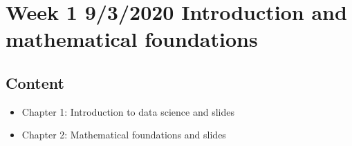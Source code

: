 \documentclass[letterpaper,10pt,english]{sphinxmanual}
\begin{document}
\section{Week 1 \sphinxhyphen{} 9/3/2020 \sphinxhyphen{} Introduction and mathematical foundations}
\label{\detokenize{course-schedule:week-1-9-3-2020-introduction-and-mathematical-foundations}}

\subsection{Content}
\label{\detokenize{course-schedule:content}}\begin{itemize}
\item {} 
Chapter 1: Introduction to data science \sphinxhyphen{} {\hyperref[\detokenize{chapter-1-intro-to-data-science::doc}]{}} and slides

\item {} 
Chapter 2: Mathematical foundations \sphinxhyphen{} {\hyperref[\detokenize{chapter-2-mathematical-foundations::doc}]{}} and slides

\end{itemize}
\end{document}
